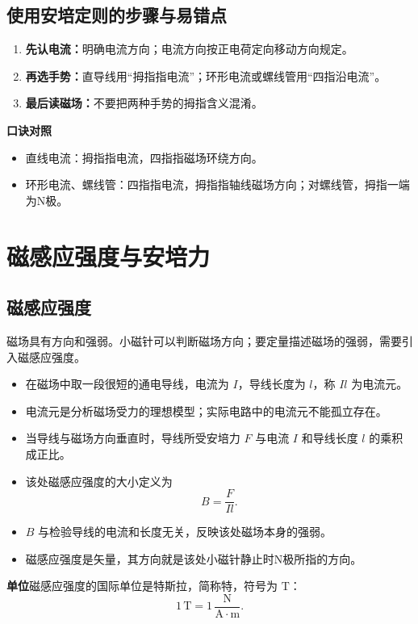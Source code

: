 \documentclass[a4paper,12pt,twoside]{article}
\begin{document}
\subsection{使用安培定则的步骤与易错点}
\begin{enumerate}
    \item \textbf{先认电流：}明确电流方向；电流方向按正电荷定向移动方向规定。
    \item \textbf{再选手势：}直导线用“拇指指电流”；环形电流或螺线管用“四指沿电流”。
    \item \textbf{最后读磁场：}不要把两种手势的拇指含义混淆。
\end{enumerate}
\begin{formal}
    \noindent\textbf{口诀对照}
    \begin{itemize}
        \item 直线电流：拇指指电流，四指指磁场环绕方向。
        \item 环形电流、螺线管：四指指电流，拇指指轴线磁场方向；对螺线管，拇指一端为N极。
    \end{itemize}
\end{formal}


\section{磁感应强度与安培力}

\subsection{磁感应强度}
磁场具有方向和强弱。小磁针可以判断磁场方向；要定量描述磁场的强弱，需要引入磁感应强度。
\begin{itemize}
    \item 在磁场中取一段很短的通电导线，电流为 \(I\)，导线长度为 \(l\)，称 \(Il\) 为电流元。
    \item 电流元是分析磁场受力的理想模型；实际电路中的电流元不能孤立存在。
    \item 当导线与磁场方向垂直时，导线所受安培力 \(F\) 与电流 \(I\) 和导线长度 \(l\) 的乘积成正比。
    \item 该处磁感应强度的大小定义为
          \[
              B = \frac{F}{Il}.
          \]
    \item \(B\) 与检验导线的电流和长度无关，反映该处磁场本身的强弱。
    \item 磁感应强度是矢量，其方向就是该处小磁针静止时N极所指的方向。
\end{itemize}
\begin{formal}
    \noindent\textbf{单位}\quad 磁感应强度的国际单位是特斯拉，简称特，符号为 \(\mathrm{T}\)：
    \[
        1\,\mathrm{T} = 1\,\frac{\mathrm{N}}{\mathrm{A}\cdot\mathrm{m}}.
    \]
\end{formal}
\end{document}
